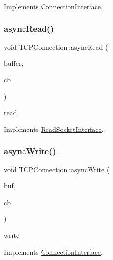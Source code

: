 Implements \hyperlink{class_connection_interface}{Connection\+Interface}.

\mbox{\label{class_t_c_p_connection_a32fb26d3c6d30c59a5b8c5c7a056b1b9}} 
\subsubsection{\texorpdfstring{async\+Read()}{asyncRead()}}
{\footnotesize\ttfamily void T\+C\+P\+Connection\+::async\+Read (\begin{DoxyParamCaption}\item[{\hyperlink{struct_m_buffer}{M\+Buffer} \&}]{buffer,  }\item[{Async\+Read\+Callback\+Type}]{cb }\end{DoxyParamCaption})\hspace{0.3cm}{\ttfamily [virtual]}}

read 

Implements \hyperlink{class_read_socket_interface}{Read\+Socket\+Interface}.

\mbox{\label{class_t_c_p_connection_af45c4a0d2feb5faefd2d82505460bf15}} 
\subsubsection{\texorpdfstring{async\+Write()}{asyncWrite()}\hspace{0.1cm}{\footnotesize\ttfamily [1/2]}}
{\footnotesize\ttfamily void T\+C\+P\+Connection\+::async\+Write (\begin{DoxyParamCaption}\item[{\hyperlink{struct_m_buffer}{M\+Buffer} \&}]{buf,  }\item[{Async\+Write\+Callback\+Type}]{cb }\end{DoxyParamCaption})\hspace{0.3cm}{\ttfamily [virtual]}}

write 

Implements \hyperlink{class_connection_interface}{Connection\+Interface}.

\mbox{\label{class_t_c_p_connection_ad4b619a97387b39d107abfa4c3d9efe5}} 
